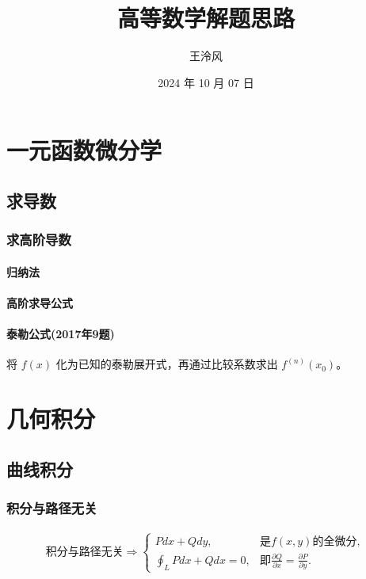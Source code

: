 \documentclass[a4paper,12pt,UTF8]{ctexart}
\begin{document}
    \title{高等数学解题思路}
    \author{王泠风}
    \date{2024 年 10 月 07 日}
    \maketitle

    \section{一元函数微分学}

    \subsection{求导数}

    \subsubsection{求高阶导数}

    \paragraph{归纳法}

    \paragraph{高阶求导公式}

    \paragraph{泰勒公式(2017年9题)}
    将 \(f(x)\) 化为已知的泰勒展开式，再通过比较系数求出 \(f^{(n)}(x_0)\)。

    \section{几何积分}

    \subsection{曲线积分}

    \subsubsection{积分与路径无关}
    \begin{align*}
        \text{积分与路径无关} \Rightarrow 
        \begin{cases}
            Pdx+Qdy,& \text{是} f(x, y) \text{的全微分},\\
            \oint_{L} Pdx+Qdx = 0,& \text{即} \frac{\partial Q}{\partial x} = \frac{\partial P}{\partial y}.
        \end{cases}
    \end{align*}
    
\end{document}

